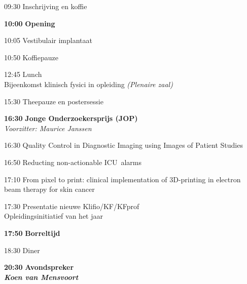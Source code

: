\documentclass[a4paper,10pt]{report}
\begin{document}
\begin{multicols*}{3}
\begin{packed_enum}
    \item[09:30] Inschrijving en koffie
        \vfill
    \item[\textbf{10:00}] \textbf{Opening}
        \vfill
    \item[10:05] Vestibulair implantaat
        \vfill
    \item[10:50] Koffiepauze
        \vfill
    \item[{\color{Blue}{\textbf{11:20}}}]{ }
        \vfill
    \item[12:45] Lunch\\
        {\small Bijeenkomst klinisch fysici in opleiding \hfill\textit{(Plenaire zaal)}}
        \vfill
    \item[{\color{Blue}{\textbf{14:00}}}]{ }
        \vfill
    \item[15:30] Theepauze en postersessie 
        \vfill
    \item[\textbf{16:30}] {\textbf{Jonge Onderzoekersprijs (JOP)}}\\\textit{Voorzitter: Maurice Janssen}
    \item[16:30] Quality Control in Diagnostic Imaging using Images of Patient Studies
    \item[16:50] Reducting non-actionable ICU alarms
    \item[17:10] From pixel to print: clinical implementation of 3D-printing in electron beam therapy for skin cancer
        \vfill
    \item[17:30] Presentatie nieuwe Klifio/KF/KFprof\\Opleidingsinitiatief van het jaar
        \vfill
    \item[\textbf{17:50}] {\textbf{Borreltijd}}
        \vfill
    \item[18:30] Diner
        \vfill
    \item[\textbf{20:30}] {\textbf{Avondspreker}}\\\textbf{\textit{Koen van Mensvoort}}
    \end{packed_enum}%



\end{multicols*}
\end{document}
